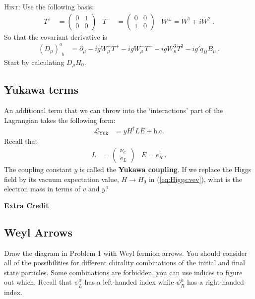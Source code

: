 \documentclass[12pt]{article}
\begin{document}
\textsc{Hint}: Use the following basis:
\begin{align}
	T^+ &= 
	\begin{pmatrix}
	0 & 1 \\
	0 & 0	
	\end{pmatrix}
	&
	T^- &=
	\begin{pmatrix}
	0 & 0 \\
	1 & 0	
	\end{pmatrix}
	&
	W^\pm = W^1 \mp i W^2 \ .
\end{align}
So that the covariant derivative is
\begin{align}
	\left(D_\mu\right)^a_{\phantom{a}b} &= \partial_\mu 
	- i g W_\mu^+ T^+
	- i g W_\mu^- T^-
	- i g W_\mu^3 T^3
	- ig' q_H B_\mu \ .
\end{align}
Start by calculating $D_\mu H_0$.


\subsection{Yukawa terms}

An additional term that we can throw into the `interactions' part of the Lagrangian takes the following form:
\begin{align}
	\mathcal L_\text{Yuk} &=
	y H^\dag L \bar E + \text{h.c.}
\end{align}
Recall that 
\begin{align}
	L &= \begin{pmatrix}
		\nu_e \\
		e_L
	\end{pmatrix}
	&
	\bar E = e_R^\dag \ .
\end{align}
The coupling constant $y$ is called the \textbf{Yukawa coupling}. If we replace the Higgs field by its vacuum expectation value, $H\to H_0$ in (\ref{eq:Higgs:vev}), what is the electron mass in terms of $v$ and $y$?


\appendix
\vspace{1em}
{\Large\textbf{Extra Credit}}






\subsection{Weyl Arrows}

Draw the diagram in Problem 1 with Weyl fermion arrows.  You should consider all of the possibilities for different chirality combinations of the initial and final state particles. Some combinations are forbidden, you can use indices to figure out which. Recall that $\psi_L^\alpha$ has a left-handed index while $\psi_R^{\dot\alpha}$ has a right-handed index. 
\end{document}
